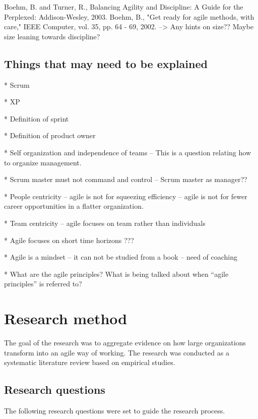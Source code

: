 \documentclass[preprint,authoryear,12pt]{elsarticle}
\begin{document}
Boehm, B. and Turner, R., Balancing Agility and Discipline: A Guide for the
Perplexed: Addison-Wesley, 2003.
Boehm, B., "Get ready for agile methods, with care," IEEE Computer, vol. 35,
pp. 64 - 69, 2002.
--> Any hints on size?? Maybe size leaning towards discipline?

\subsection{Things that may need to be explained}

* Scrum

* XP

* Definition of sprint

* Definition of product owner

* Self organization and independence of teams -- This is a question relating how
  to organize management. 

* Scrum master must not command and control -- Scrum master as manager??

* People centricity -- agile is not for squeezing efficiency -- agile is not for
  fewer career opportunities in a flatter organization.

* Team centricity -- agile focuses on team rather than individuals

* Agile focuses on short time horizons ???

* Agile is a mindset -- it can not be studied from a book -- need of coaching

* What are the agile principles? What is being talked about when ``agile
  principles'' is referred to?

\section{Research method}
\label{sec:method}

The goal of the research was to aggregate evidence on how large organizations
transform into an agile way of working. The research was conducted as a
systematic literature review based on empirical studies.

\subsection{Research questions}

The following research questions were set to guide the research process.
\end{document}
